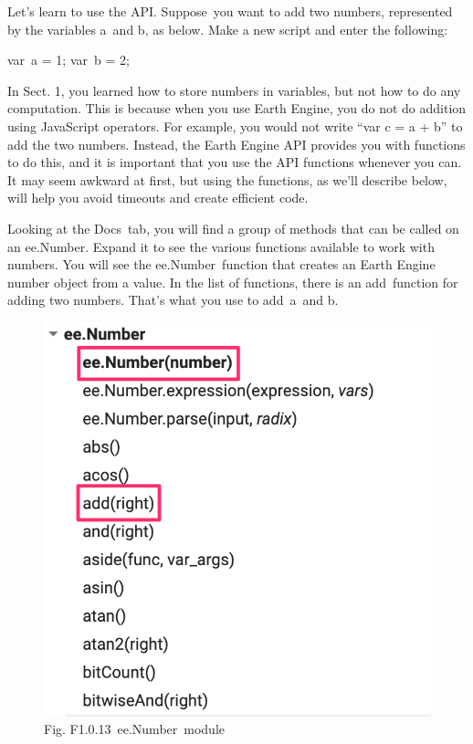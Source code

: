 \documentclass[
  letterpaper,
  DIV=11,
  numbers=noendperiod]{scrreprt}
\newenvironment{Shaded}{\begin{snugshade}}{\end{snugshade}}
\newcommand{\DecValTok}[1]{\textcolor[rgb]{0.68,0.00,0.00}{#1}}
\newcommand{\NormalTok}[1]{\textcolor[rgb]{0.00,0.23,0.31}{#1}}
\newcommand{\OperatorTok}[1]{\textcolor[rgb]{0.37,0.37,0.37}{#1}}
\begin{document}
Let's learn to use the API. Suppose~you want to add two numbers,
represented by the variables a~and b, as below. Make a new script and
enter the following:

\begin{Shaded}
\begin{Highlighting}[]
\NormalTok{var a }\OperatorTok{=} \DecValTok{1}\OperatorTok{;}  
\NormalTok{var b }\OperatorTok{=} \DecValTok{2}\OperatorTok{;}
\end{Highlighting}
\end{Shaded}

In Sect. 1, you learned how to store numbers in variables, but not how
to do any computation. This is because when you use Earth Engine, you do
not do addition using JavaScript operators. For example, you would not
write ``var c = a + b'' to add the two numbers. Instead, the Earth
Engine API provides you with functions to do this, and it is important
that you use the API functions whenever you can. It may seem awkward at
first, but using the functions, as we'll describe below, will help you
avoid timeouts and create efficient code.

Looking at the Docs~tab, you will find a group of methods that can be
called on an ee.Number. Expand it to see the various functions available
to work with numbers. You will see the ee.Number~function that creates
an Earth Engine number object from a value. In the list of functions,
there is an add~function for adding two numbers. That's what you use to
add~a~and b.

\begin{figure}

{\centering \includegraphics{./F1/image13.png}

}

\caption{Fig. F1.0.13~ee.Number~module}

\end{figure}
\end{document}
